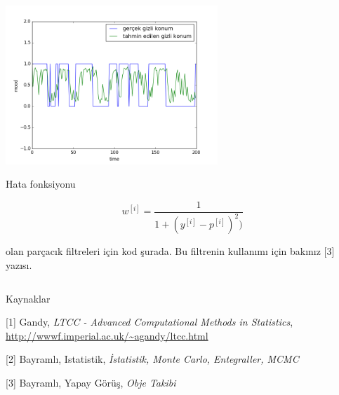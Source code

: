 \documentclass[12pt,fleqn]{article}\usepackage{../../common}
\begin{document}
\includegraphics[height=6cm]{tser_pf_01.png}

Hata fonksiyonu 

$$
w^{[i]} = \frac{1}{1 + (y^{[i]} - p^{[i]})^2  )}
$$

olan parçacık filtreleri için kod şurada. Bu filtrenin kullanımı için
bakınız [3] yazısı. 

\inputminted[fontsize=\footnotesize]{python}{PF.py}

Kaynaklar

[1] Gandy, {\em LTCC - Advanced Computational Methods in Statistics},
\url{http://wwwf.imperial.ac.uk/~agandy/ltcc.html}

[2] Bayramlı, Istatistik, {\em İstatistik, Monte Carlo, Entegraller, MCMC}

[3] Bayramlı, Yapay Görüş, {\em Obje Takibi}
\end{document}
